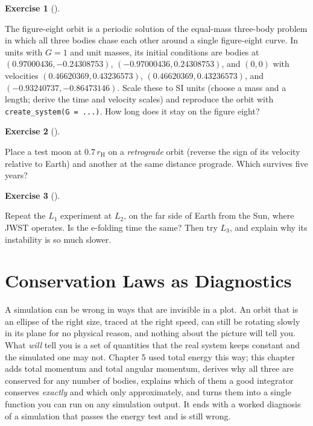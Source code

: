 \documentclass[
  10.5pt,
  letterpaper,
]{scrbook}
\theoremstyle{definition}
\newtheorem{exercise}{Exercise}[chapter]
\theoremstyle{plain}
\theoremstyle{remark}
\begin{document}
\begin{exercise}[]\protect\hypertarget{exr-ch11-figure-eight}{}\label{exr-ch11-figure-eight}

The figure-eight orbit is a periodic solution of the equal-mass
three-body problem in which all three bodies chase each other around a
single figure-eight curve. In units with \(G = 1\) and unit masses, its
initial conditions are bodies at \((0.97000436, -0.24308753)\),
\((-0.97000436, 0.24308753)\), and \((0, 0)\) with velocities
\((0.46620369, 0.43236573)\), \((0.46620369, 0.43236573)\), and
\((-0.93240737, -0.86473146)\). Scale these to SI units (choose a mass
and a length; derive the time and velocity scales) and reproduce the
orbit with \texttt{create\_system(G\ =\ ...)}. How long does it stay on
the figure eight?

\end{exercise}

\begin{exercise}[]\protect\hypertarget{exr-ch11-retrograde-hill}{}\label{exr-ch11-retrograde-hill}

Place a test moon at \(0.7\,r_{\mathrm{H}}\) on a \emph{retrograde}
orbit (reverse the sign of its velocity relative to Earth) and another
at the same distance prograde. Which survives five years?

\end{exercise}

\begin{exercise}[]\protect\hypertarget{exr-ch11-l2}{}\label{exr-ch11-l2}

Repeat the \(L_1\) experiment at \(L_2\), on the far side of Earth from
the Sun, where JWST operates. Is the e-folding time the same? Then try
\(L_3\), and explain why its instability is so much slower.

\end{exercise}

\chapter{Conservation Laws as Diagnostics}\label{sec-diagnostics}

A simulation can be wrong in ways that are invisible in a plot. An orbit
that is an ellipse of the right size, traced at the right speed, can
still be rotating slowly in its plane for no physical reason, and
nothing about the picture will tell you. What \emph{will} tell you is a
set of quantities that the real system keeps constant and the simulated
one may not. Chapter 5 used total energy this way; this chapter adds
total momentum and total angular momentum, derives why all three are
conserved for any number of bodies, explains which of them a good
integrator conserves \emph{exactly} and which only approximately, and
turns them into a single function you can run on any simulation output.
It ends with a worked diagnosis of a simulation that passes the energy
test and is still wrong.
\end{document}
